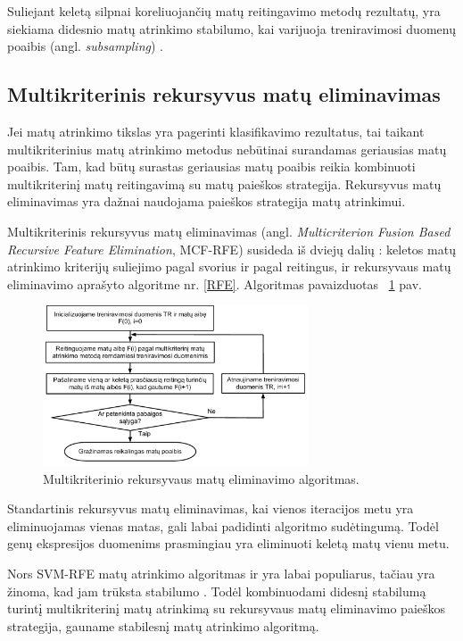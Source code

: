 Suliejant keletą silpnai koreliuojančių matų reitingavimo metodų rezultatų, yra siekiama didesnio matų atrinkimo stabilumo, kai varijuoja treniravimosi duomenų poaibis (angl. \textit{subsampling}) \cite{yang2011robust}.

\subsection{Multikriterinis rekursyvus matų eliminavimas}

Jei matų atrinkimo tikslas yra pagerinti klasifikavimo rezultatus, tai taikant multikriterinius matų atrinkimo metodus nebūtinai surandamas geriausias matų poaibis. Tam, kad būtų surastas geriausias matų poaibis reikia kombinuoti multikriterinį matų reitingavimą su matų paieškos strategija. Rekursyvus matų eliminavimas yra dažnai naudojama paieškos strategija matų atrinkimui. 

Multikriterinis rekursyvus matų eliminavimas (angl. \textit{Multicriterion Fusion Based Recursive Feature Elimination}, MCF-RFE) susideda iš dviejų dalių \cite{yang2011robust}: keletos matų atrinkimo kriterijų suliejimo pagal svorius ir pagal reitingus, ir rekursyvaus matų eliminavimo aprašyto algoritme nr. \ref{RFE}. Algoritmas pavaizduotas ~\ref{fig:figure6} pav.
\begin{figure}
 \centering
 \includegraphics[width=0.7\textwidth]{images/mcf-rfe_procedure.pdf}
 \caption{Multikriterinio rekursyvaus matų eliminavimo algoritmas.}
 \label{fig:figure6}
\end{figure}

Standartinis rekursyvus matų eliminavimas, kai vienos iteracijos metu yra eliminuojamas vienas matas, gali labai padidinti algoritmo sudėtingumą. Todėl genų ekspresijos duomenims prasmingiau yra eliminuoti keletą matų vienu metu.

Nors SVM-RFE matų atrinkimo algoritmas ir yra labai populiarus, tačiau yra žinoma, kad jam trūksta stabilumo \cite{guyon2002gene}. Todėl kombinuodami didesnį stabilumą turintį multikriterinį matų atrinkimą su rekursyvaus matų eliminavimo paieškos strategija, gauname stabilesnį matų atrinkimo algoritmą.

